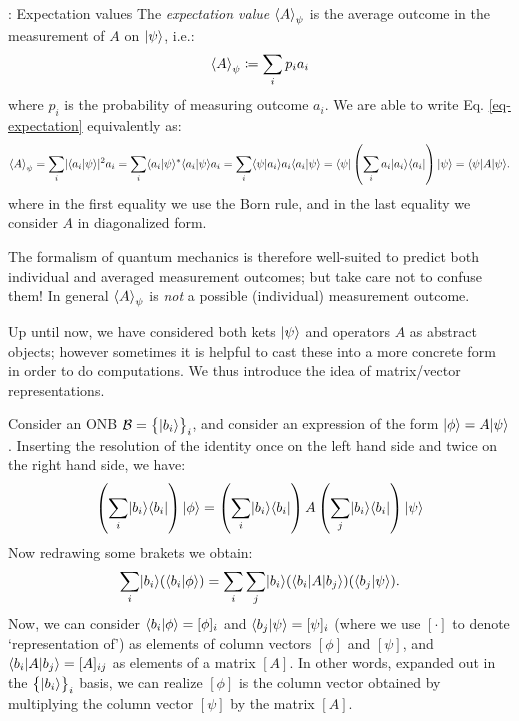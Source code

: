 \begin{defbox}{: Expectation values}
    The \emph{expectation value} $\left< A \right>_\psi$ is the average outcome in the measurement of $A$ on $\lvert \psi \rangle$, i.e.:
    \begin{equation}\label{eq-expectation}
        \left< A \right>_\psi \coloneqq \sum_i p_i a_i
    \end{equation}
    where $p_i$ is the probability of measuring outcome $a_i$. We are able to write Eq. \eqref{eq-expectation} equivalently as:
    \begin{equation}\label{eq-expection2}
        \left< A \right>_\psi = \sum_i \lvert \langle a_i \lvert \psi \rangle \rvert^2 a_i = \sum_i \langle a_i \lvert \psi \rangle^* \langle a_i \lvert \psi \rangle a_i = \sum_i \langle \psi \lvert a_i \rangle a_i \langle a_i \lvert \psi \rangle = \langle \psi \rvert\left(\sum_i a_i \lvert a_i \rangle \langle a_i \rvert\right)\lvert \psi \rangle = \langle \psi \rvert A\lvert \psi \rangle.
    \end{equation}
    where in the first equality we use the Born rule, and in the last equality we consider $A$ in diagonalized form.
\end{defbox}

The formalism of quantum mechanics is therefore well-suited to predict both individual and averaged measurement outcomes; but take care not to confuse them! In general $\left< A \right>_\psi$ is \emph{not} a possible (individual) measurement outcome.

Up until now, we have considered both kets $\lvert \psi \rangle$ and operators $A$ as abstract objects; however sometimes it is helpful to cast these into a more concrete form in order to do computations. We thus introduce the idea of matrix/vector representations.

Consider an ONB $\mathcal{B} = \set{\lvert b_i \rangle}_i$, and consider an expression of the form $\ket{\phi} = A\ket{\psi}$. Inserting the resolution of the identity once on the left hand side and twice on the right hand side, we have:
\begin{equation}
    \left(\sum_i \dyad{b_i}{b_i}\right)\ket{\phi} = \left(\sum_i \dyad{b_i}{b_i}\right)A\left(\sum_j \dyad{b_i}{b_i}\right)\ket{\psi}
\end{equation}
Now redrawing some brakets we obtain:
\begin{equation}
    \sum_i \ket{b_i}(\braket{b_i}{\phi}) = \sum_{i}\sum_j \ket{b_i}(\bra{b_i}A\ket{b_j})(\braket{b_j}{\psi}).
\end{equation}
Now, we can consider $\braket{b_i}{\phi} = [\phi]_i$ and $\langle b_j \lvert \psi \rangle = [\psi]_i$ (where we use $[\cdot]$ to denote `representation of') as elements of column vectors $[\phi]$ and $[\psi]$, and $\langle b_i \rvert A\lvert b_j \rangle = [A]_{ij}$ as elements of a matrix $[A]$. In other words, expanded out in the $\set{\lvert b_i \rangle}_i$ basis, we can realize $[\phi]$ is the column vector obtained by multiplying the column vector $[\psi]$ by the matrix $[A]$.

